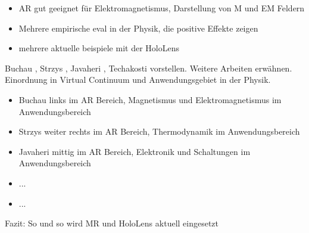 \begin{itemize}
	\item AR gut geeignet für Elektromagnetismus, Darstellung von M und EM Feldern
	\item Mehrere empirische eval in der Physik, die positive Effekte zeigen
	\item mehrere aktuelle beispiele mit der HoloLens
\end{itemize}
Buchau \cite{Buchau09}, Strzys \cite{Strzys18}, Javaheri \cite{Javaheri18}, Techakosti \cite{Techakosit15} vorstellen. Weitere Arbeiten erwähnen.\\
Einordnung in Virtual Continuum und Anwendungsgebiet in der Physik.




\begin{itemize}
	\item Buchau links im AR Bereich, Magnetismus und Elektromagnetismus im Anwendungsbereich
	\item Strzys weiter rechts im AR Bereich, Thermodynamik im Anwendungsbereich
	\item Javaheri mittig im AR Bereich, Elektronik und Schaltungen im Anwendungsbereich
	\item ...
	\item ...
\end{itemize}

Fazit: So und so wird MR und HoloLens aktuell eingesetzt

